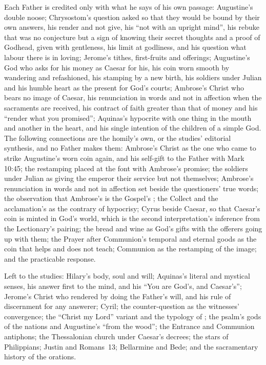 {Each Father is credited only with what he says of his own passage:
Augustine's double noose; Chrysostom's question asked so that they would be
bound by their own answers, his render and not give, his ``not with an upright
mind'', his rebuke that was no conjecture but a sign of knowing their secret
thoughts and a proof of Godhead, given with gentleness, his limit at
godliness, and his question what labour there is in loving; Jerome's tithes,
first-fruits and offerings; Augustine's God who asks for his money as Caesar for his, his coin worn smooth
by wandering and refashioned, his stamping by a new birth, his soldiers under
Julian and his humble heart as the present for God's courts; Ambrose's Christ
who bears no image of Caesar, his renunciation in words and not in affection
when the sacraments are received, his contract of faith greater than that of
money and his ``render what you promised''; Aquinas's hypocrite with one thing
in the mouth and another in the heart, and his single intention of the
children of a simple God. The following connections are the homily's own, or
the studies' editorial synthesis, and no Father makes them: Ambrose's Christ
as the one who came to strike Augustine's worn coin again, and his self-gift
to the Father with Mark 10:45; the restamping placed at the font with
Ambrose's promise; the soldiers under Julian as giving the emperor their
service but not themselves; Ambrose's renunciation in words and not in
affection set beside the questioners' true words; the observation that Ambrose's
 is the Gospel's ; the Collect and the
acclamation's  as the contrary of hypocrisy; Cyrus beside
Caesar, so that Caesar's coin is minted in God's world, which is the second
interpretation's inference from the Lectionary's pairing; the bread and wine
as God's gifts with the offerers going up with them; the Prayer after
Communion's temporal and eternal goods as the coin that helps and does not
teach; Communion as the restamping of the image; and the practicable response.

Left to the studies: Hilary's body, soul and will;
Aquinas's literal and mystical senses, his answer first to the mind, and his
``You are God's, and Caesar's''; Jerome's Christ who rendered by doing the
Father's will, and his rule of discernment for any answerer; Cyril; the
counter-question as the witnesses' convergence; the ``Christ my Lord'' variant
and the typology of ; the psalm's gods of the nations and
Augustine's ``from the wood''; the Entrance and Communion antiphons; the Thessalonian church under Caesar's decrees; the stars of
Philippians; Justin and Romans~13; Bellarmine and Bede; and the sacramentary
history of the orations.

}
